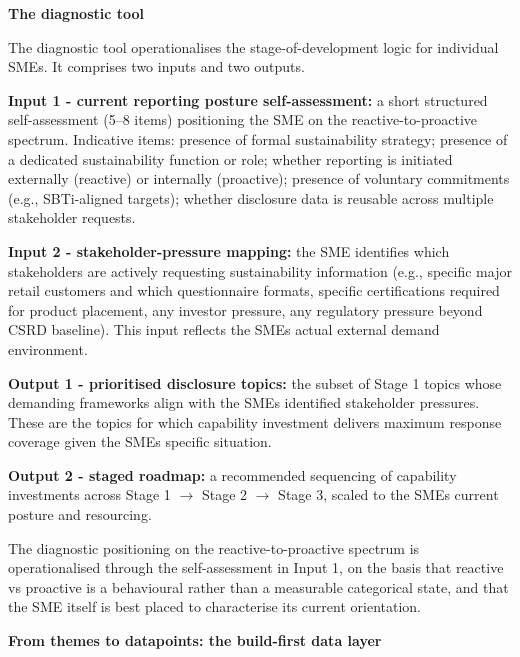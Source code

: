 \documentclass[
]{article}
\begin{document}
\textbf{The diagnostic tool}

The diagnostic tool operationalises the stage-of-development logic for
individual SMEs. It comprises two inputs and two outputs.

\textbf{Input 1 - current reporting posture self-assessment:} a short
structured self-assessment (5--8 items) positioning the SME on the
reactive-to-proactive spectrum. Indicative items: presence of formal
sustainability strategy; presence of a dedicated sustainability function
or role; whether reporting is initiated externally (reactive) or
internally (proactive); presence of voluntary commitments (e.g.,
SBTi-aligned targets); whether disclosure data is reusable across
multiple stakeholder requests.

\textbf{Input 2 - stakeholder-pressure mapping:} the SME identifies
which stakeholders are actively requesting sustainability information
(e.g., specific major retail customers and which questionnaire formats,
specific certifications required for product placement, any investor
pressure, any regulatory pressure beyond CSRD baseline). This input
reflects the SME\textquotesingle s actual external demand environment.

\textbf{Output 1 - prioritised disclosure topics:} the subset of Stage 1
topics whose demanding frameworks align with the SME\textquotesingle s
identified stakeholder pressures. These are the topics for which
capability investment delivers maximum response coverage given the
SME\textquotesingle s specific situation.

\textbf{Output 2 - staged roadmap:} a recommended sequencing of
capability investments across Stage 1 $\to$ Stage 2 $\to$ Stage 3, scaled to the
SME\textquotesingle s current posture and resourcing.

The diagnostic positioning on the reactive-to-proactive spectrum is
operationalised through the self-assessment in Input 1, on the basis
that reactive vs proactive is a behavioural rather than a measurable
categorical state, and that the SME itself is best placed to
characterise its current orientation.

\textbf{From themes to datapoints: the build-first data layer}
\end{document}

